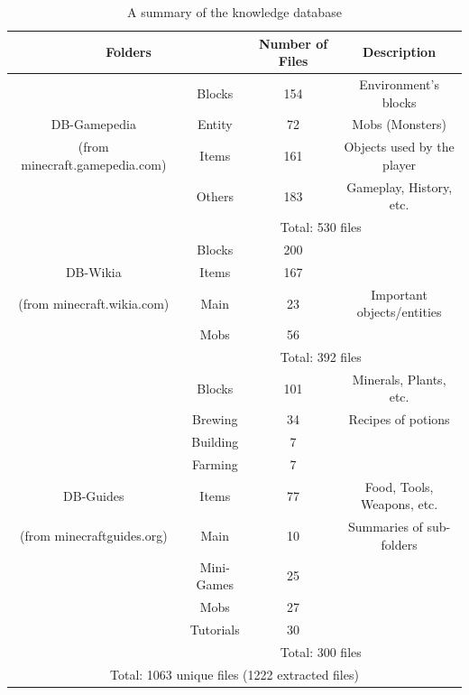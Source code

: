 \documentclass[12pt]{article}
\begin{document}
\begin{table}
	\centering
	\begin{tabular}{|c|c|c|c|}
	\hline
	\multicolumn{2}{|c|}{Folders} & Number of Files & Description\\
	\hline
	 & Blocks & 154 & Environment's blocks\\
	\cline{2-4}
	DB-Gamepedia & Entity & 72 & Mobs (Monsters)\\
	\cline{2-4}
	(from minecraft.gamepedia.com) & Items & 161 & Objects used by the player\\
	\cline{2-4}
	 & Others & 183 & Gameplay, History, etc.\\
	\cline{2-4}
	 & \multicolumn{3}{|c|}{Total: 530 files}\\ %
	\hline
	 & Blocks & 200 & \\
	\cline{2-4}
	DB-Wikia & Items & 167 & \\
	\cline{2-4}
	(from minecraft.wikia.com) & Main & 23 & Important objects/entities\\
	\cline{2-4}
	 & Mobs & 56 & \\
	\cline{2-4}
	 & \multicolumn{3}{|c|}{Total: 392 files}\\ %
	 \hline
	 & Blocks & 101 & Minerals, Plants, etc.\\
	\cline{2-4}
	 & Brewing & 34 & Recipes of potions\\
	\cline{2-4}
	 & Building & 7 & \\
	\cline{2-4}
	 & Farming & 7 & \\
	\cline{2-4}
	DB-Guides & Items & 77 & Food, Tools, Weapons, etc.\\
	\cline{2-4}
	(from minecraftguides.org) & Main & 10 & Summaries of sub-folders\\
	\cline{2-4}
	 & Mini-Games & 25 & \\
	\cline{2-4}
	 & Mobs & 27 & \\
	\cline{2-4}
	 & Tutorials & 30 & \\
	\cline{2-4}
	 & \multicolumn{3}{|c|}{Total: 300 files}\\
	\hline
	 \multicolumn{4}{|c|}{Total: 1063 unique files (1222 extracted files)}\\
	\hline
	\end{tabular}
   	\caption{\label{tableDB} A summary of the knowledge database}
\end{table}
\end{document}
